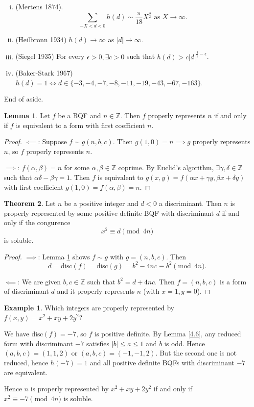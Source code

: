 \documentclass{article}
\theoremstyle{definition}
\newtheorem{theorem}{Theorem}[section]
\newtheorem{lemma}[theorem]{Lemma}
\newtheorem{example}{Example}[section]
\begin{document}
\begin{enumerate}[(i)]
    \item (Mertens 1874). \[
    \sum_{-X<d<0}^{} h(d) \sim \frac{\pi}{18} X^{\frac{3}{2}} \text{ as } X \to \infty.
    \]
    \item (Heilbronn 1934) $h(d) \to \infty$ as $|d| \to \infty$.
    \item (Siegel 1935) For every $\epsilon>0, \exists c>0$ such that $h(d)>c |d|^{\frac{1}{2}-\epsilon}$.
    \item (Baker-Stark 1967) $h(d)=1 \iff d \in \{-3,-4,-7,-8,-11,-19,-43,-67,-163\}$.
\end{enumerate}
End of aside.

\begin{lemma}\label{4.9}
    Let $f$ be a BQF and $n \in \mathbb{Z}$. Then $f$ properly represents $n$ if and only if $f$ is equivalent to a form with first coefficient $n$.
\end{lemma}
\begin{proof}
    $\impliedby$: Suppose $f \sim g(n,b,c)$. Then $g(1,0)=n \implies g$ properly represents $n$, so $f$ properly represents $n$.
    \vspace{1mm}
    
    $\implies$: $f(\alpha,\beta)=n$ for some $\alpha,\beta \in \mathbb{Z}$ coprime. By Euclid's algorithm, $\exists \gamma,\delta \in \mathbb{Z}$ such that $\alpha \delta - \beta \gamma = 1$. Then $f$ is equivalent to $g(x,y) = f(\alpha x + \gamma y, \beta x + \delta y)$ with first coefficient $g(1,0) = f(\alpha,\beta)=n$.
\end{proof}
\begin{theorem}
    Let $n$ be a positive integer and $d<0$ a discriminant. Then $n$ is properly represented by some positive definite BQF with discriminant $d$ if and only if the congurence $$x^2 \equiv d \pmod{4n}$$ is soluble.
\end{theorem}
\begin{proof}
    $\implies$: Lemma \ref{4.9} shows $f \sim g$ with $g = (n,b,c)$. Then $$d = \text{disc}(f) = \text{disc}(g) = b^2 - 4nc \equiv b^2 \pmod{4n}.$$
    \vspace{1mm}
    
    $\impliedby$: We are given $b,c \in \mathbb{Z}$ such that $b^2 = d + 4nc$. Then $f = (n,b,c)$ is a form of discriminant $d$ and it properly represents $n$ (with $x=1,y=0$).
\end{proof}
\begin{example}
    Which integers are properly represented by $f(x,y)={x^2+xy+2y^2}$?
    \vspace{1mm}
    
    We have $\text{disc}(f)=-7$, so $f$ is positive definite. By Lemma \ref{4.6}, any reduced form with discriminant $-7$ satisfies $|b|\le a \le 1$ and $b$ is odd. Hence $(a,b,c)=(1,1,2)$ or $(a,b,c) = (-1,-1,2)$. But the second one is not reduced, hence $h(-7)=1$ and all positive definite BQFs with discriminant $-7$ are equivalent.
    \vspace{1mm}
    
    Hence $n$ is properly represented by $x^2+xy+2y^2$ if and only if $x^2 \equiv -7 \pmod{4n}$ is soluble.
\end{example}
\end{document}
